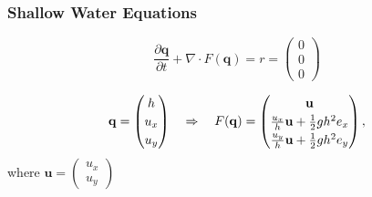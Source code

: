 \documentclass{beamer}
\newcommand{\pd}[2]{\dfrac{\partial #1}{\partial #2}}
\begin{document}
\begin{frame}
  \frametitle{Shallow Water Equations}
  \vspace{-.3cm}
  \begin{equation}
    \label{eq:shallow-water-basic}
    \pd{\mathbf{q}}{t} + \nabla \cdot F(\mathbf{q}) = r = \begin{pmatrix}
      0 \\ 0\\ 0
    \end{pmatrix}
  \end{equation}


  \begin{eqnarray*}
    \mathbf{q} =
    \begin{pmatrix}
      h \\ u_x \\ u_y
    \end{pmatrix} \quad \Rightarrow \quad F(\mathbf{q}) =
    {
      \renewcommand{\arraystretch}{1.2}
      \begin{pmatrix}
        \mathbf{u} \\ \frac{u_x}{h} \mathbf{u} + \frac{1}{2} g h^2 e_x \\ \frac{u_y}{h} \mathbf{u}+
        \frac{1}{2} g h^2 e_y
      \end{pmatrix},
    }
  \end{eqnarray*}
  where $\mathbf{u}=
  \begin{pmatrix}
    u_x \\ u_y
  \end{pmatrix}$
\end{frame}
\end{document}
